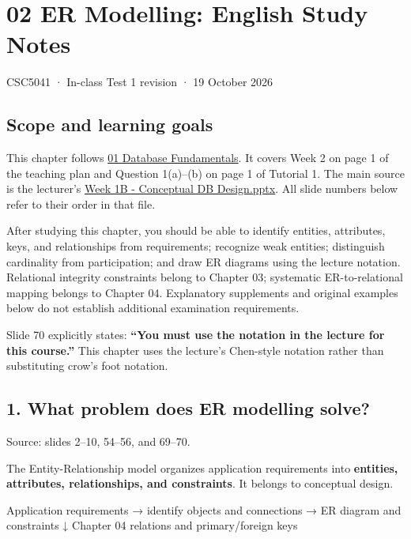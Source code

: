 \clearpage
\section{02 ER Modelling: English Study Notes}\label{02_er_modelling_en}

CSC5041 · In-class Test 1 revision · 19 October 2026

\subsection{Scope and learning goals}\label{02_er_modelling_en-scope-and-learning-goals}

This chapter follows \hyperref[01_database_fundamentals_en]{01 Database Fundamentals}. It covers Week 2 on page 1 of the teaching plan and Question 1(a)--(b) on page 1 of Tutorial 1. The main source is the lecturer's \href{../../../slides/Week\%201B\%20-\%20Conceptual\%20DB\%20Design.pptx}{Week 1B - Conceptual DB Design.pptx}. All slide numbers below refer to their order in that file.

After studying this chapter, you should be able to identify entities, attributes, keys, and relationships from requirements; recognize weak entities; distinguish cardinality from participation; and draw ER diagrams using the lecture notation. Relational integrity constraints belong to Chapter 03; systematic ER-to-relational mapping belongs to Chapter 04. Explanatory supplements and original examples below do not establish additional examination requirements.

Slide 70 explicitly states: \textbf{``You must use the notation in the lecture for this course.''} This chapter uses the lecture's Chen-style notation rather than substituting crow's foot notation.

\subsection{1. What problem does ER modelling solve?}\label{02_er_modelling_en-what-problem-does-er-modelling-solve}

Source: slides 2--10, 54--56, and 69--70.

The Entity-Relationship model organizes application requirements into \textbf{entities, attributes, relationships, and constraints}. It belongs to conceptual design.

\begin{StudyCode}
Application requirements → identify objects and connections → ER diagram and constraints
                                                                       ↓ Chapter 04
                                                         relations and primary/foreign keys
\end{StudyCode}

